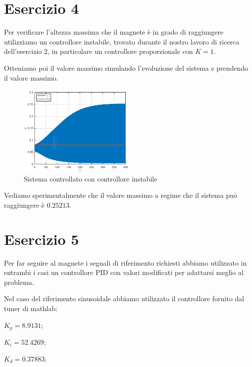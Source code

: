 \documentclass{article}
\newcommand{\spacer}[1][8pt]{
    \par\vspace{#1}
}
\begin{document}
\section{Esercizio 4}
Per verificare l'altezza massima che il magnete è in grado di raggiungere utilizziamo un controllore instabile, trovato durante il nostro lavoro di ricerca dell'esercizio 2, in particolare un controllore proporzionale con $K = 1$.

Otteniamo poi il valore massimo simulando l'evoluzione del sistema e prendendo il valore massimo.

\begin{figure}[H]
    \centering
    \includegraphics[width = 0.5\textwidth]{Images/max-z.png}
    \caption{Sistema controllato con controllore instabile}
    \label{fig:max-z}
\end{figure}

Vediamo sperimentalmente che il valore massimo a regime che il sistema può raggiungere è $0.25213$.

\section{Esercizio 5}
Per far seguire al magnete i segnali di riferimento richiesti abbiamo utilizzato in entrambi i casi un controllore PID con valori modificati per adattarsi meglio al problema.

\spacer
Nel caso del riferimento sinusoidale abbiamo utilizzato il controllore fornito dal tuner di mathlab:

$K_p = 8.9131;$

$K_i = 52.4269;$

$K_d = 0.37883;$
\end{document}
